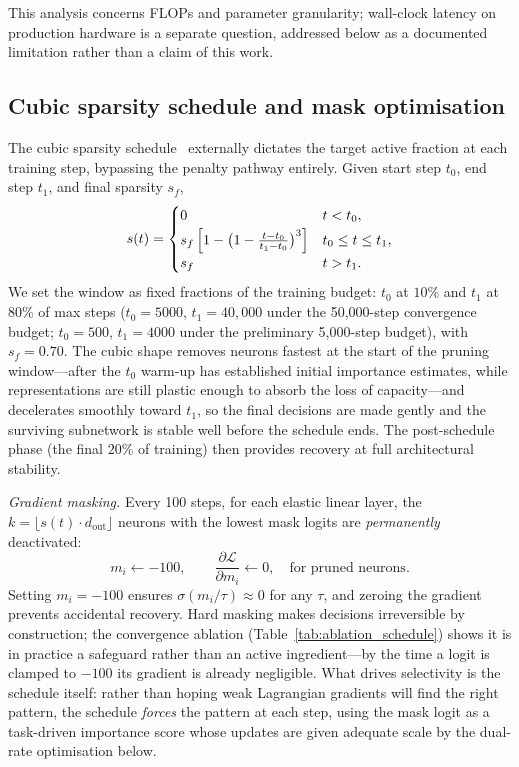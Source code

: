 \documentclass[fleqn,10pt]{article}
\begin{document}
This analysis concerns FLOPs and parameter granularity; wall-clock
latency on production hardware is a separate question, addressed
below as a documented limitation rather than a claim of this work.

\subsection*{Cubic sparsity schedule and mask optimisation}

The cubic sparsity schedule~\citep{zhu2017prune} externally dictates
the target active fraction at each training step, bypassing the
penalty pathway entirely. Given start step $t_0$, end step
$t_1$, and final sparsity $s_f$,
\begin{equation}
\label{eq:cubic}
s(t) =
\begin{cases}
0 & t < t_0, \\[2pt]
s_f\,\Bigl[1 - \bigl(1 - \tfrac{t - t_0}{t_1 - t_0}\bigr)^3\Bigr]
   & t_0 \leq t \leq t_1, \\[2pt]
s_f & t > t_1.
\end{cases}
\end{equation}
We set the window as fixed fractions of the training budget:
$t_0$ at $10\%$ and $t_1$ at $80\%$ of max steps ($t_0{=}5000$,
$t_1{=}40{,}000$ under the 50{,}000-step convergence budget;
$t_0{=}500$, $t_1{=}4000$ under the preliminary 5{,}000-step
budget), with $s_f{=}0.70$. The cubic shape
removes neurons fastest at the start of the pruning window---after
the $t_0$ warm-up has established initial importance estimates, while
representations are still plastic enough to absorb the loss of
capacity---and decelerates smoothly toward $t_1$, so the final
decisions are made gently and the surviving subnetwork is stable
well before the schedule ends. The post-schedule phase (the final
$20\%$ of training) then provides recovery at full architectural
stability.

\textit{Gradient masking.} Every 100 steps, for each elastic linear
layer, the $k = \lfloor s(t)\cdot d_{\mathrm{out}}\rfloor$ neurons
with the lowest mask logits are \emph{permanently} deactivated:
\begin{equation}
\label{eq:gradmask}
m_i \leftarrow -100,
\qquad
\frac{\partial\mathcal{L}}{\partial m_i} \leftarrow 0,
\quad
\text{for pruned neurons}.
\end{equation}
Setting $m_i = -100$ ensures $\sigma(m_i/\tau) \approx 0$ for any
$\tau$, and zeroing the gradient prevents accidental recovery. Hard
masking makes decisions irreversible by construction; the
convergence ablation (Table~\ref{tab:ablation_schedule}) shows it is in
practice a safeguard rather than an active ingredient---by the time
a logit is clamped to $-100$ its gradient is already negligible.
What drives selectivity is the schedule itself: rather than hoping
weak Lagrangian gradients will find the right pattern, the schedule
\emph{forces} the pattern at each step, using the mask logit as a
task-driven importance score whose updates are given adequate scale
by the dual-rate optimisation below.
\end{document}
